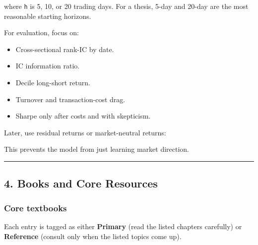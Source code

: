 where \texttt{h} is 5, 10, or 20 trading days. For a thesis, 5-day and
20-day are the most reasonable starting horizons.

For evaluation, focus on:

\begin{itemize}
\tightlist
\item
  Cross-sectional rank-IC by date.
\item
  IC information ratio.
\item
  Decile long-short return.
\item
  Turnover and transaction-cost drag.
\item
  Sharpe only after costs and with skepticism.
\end{itemize}

Later, use residual returns or market-neutral returns:

\begin{Shaded}
\begin{Highlighting}[]
\end{Highlighting}
\end{Shaded}

This prevents the model from just learning market direction.

\begin{center}\rule{0.5\linewidth}{0.5pt}\end{center}

\subsection{4. Books and Core Resources}\label{books-and-core-resources}

\subsubsection{Core textbooks}\label{core-textbooks}

Each entry is tagged as either \textbf{Primary} (read the listed
chapters carefully) or \textbf{Reference} (consult only when the listed
topics come up).

